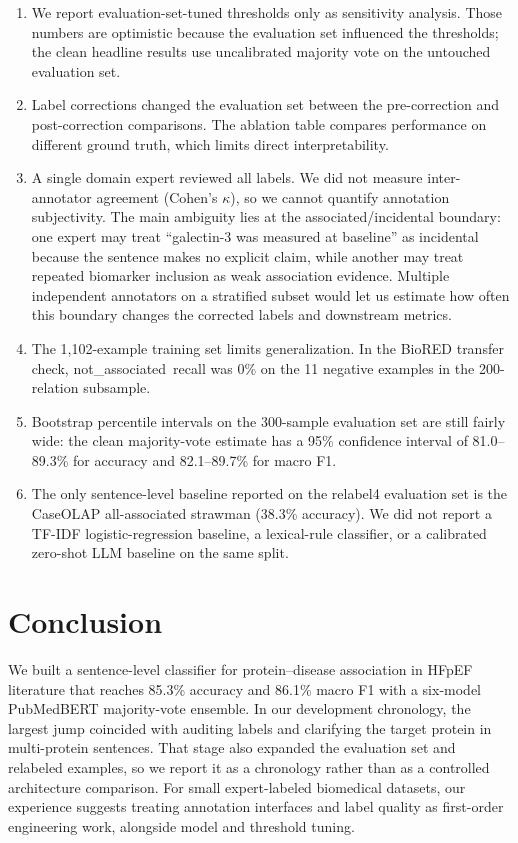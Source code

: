 \documentclass[sn-basic,pdflatex]{sn-jnl}
\newcommand{\ClassLabel}[1]{\mbox{\textup{#1}}}
\newcommand{\notassociated}{\ClassLabel{not\_associated}}
\begin{document}
\begin{enumerate}
  \item We report evaluation-set-tuned thresholds only as sensitivity analysis. Those numbers are optimistic because the evaluation set influenced the thresholds; the clean headline results use uncalibrated majority vote on the untouched evaluation set.
  \item Label corrections changed the evaluation set between the pre-correction and post-correction comparisons. The ablation table compares performance on different ground truth, which limits direct interpretability.
  \item A single domain expert reviewed all labels. We did not measure inter-annotator agreement (Cohen's $\kappa$), so we cannot quantify annotation subjectivity. The main ambiguity lies at the associated/incidental boundary: one expert may treat ``galectin-3 was measured at baseline'' as incidental because the sentence makes no explicit claim, while another may treat repeated biomarker inclusion as weak association evidence. Multiple independent annotators on a stratified subset would let us estimate how often this boundary changes the corrected labels and downstream metrics.
  \item The 1,102-example training set limits generalization. In the BioRED transfer check, \notassociated\ recall was 0\% on the 11 negative examples in the 200-relation subsample.
  \item Bootstrap percentile intervals on the 300-sample evaluation set are still fairly wide: the clean majority-vote estimate has a 95\% confidence interval of 81.0--89.3\% for accuracy and 82.1--89.7\% for macro F1.
  \item The only sentence-level baseline reported on the relabel4 evaluation set is the CaseOLAP all-associated strawman (38.3\% accuracy). We did not report a TF-IDF logistic-regression baseline, a lexical-rule classifier, or a calibrated zero-shot LLM baseline on the same split.
\end{enumerate}


\section{Conclusion}
\label{sec:conclusion}

We built a sentence-level classifier for protein--disease association in HFpEF literature that reaches 85.3\% accuracy and 86.1\% macro F1 with a six-model PubMedBERT majority-vote ensemble.
In our development chronology, the largest jump coincided with auditing labels and clarifying the target protein in multi-protein sentences. That stage also expanded the evaluation set and relabeled examples, so we report it as a chronology rather than as a controlled architecture comparison.
For small expert-labeled biomedical datasets, our experience suggests treating annotation interfaces and label quality as first-order engineering work, alongside model and threshold tuning.
\end{document}
